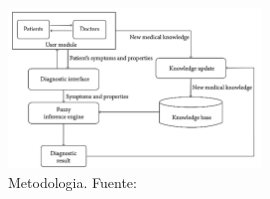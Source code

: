 \begin{figure}[H]
	\begin{center}
		\includegraphics[width=0.6\textwidth]{2/1_antecedentes/Metodologia-9.png}
		\caption{Metodologia. Fuente: \cite{ApproachtoMedical}}
	\end{center}
\end{figure}
\vspace{-10mm}
